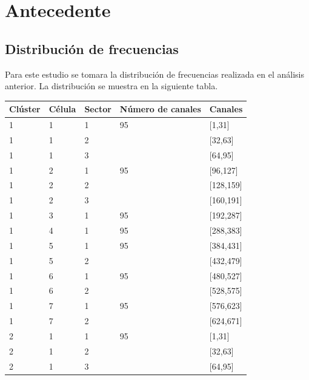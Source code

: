 \documentclass[11pt,letterpaper]{article}
\begin{document}


\newpage
\tableofcontents
\listoffigures
\listoftables


\newpage
\section{Antecedente}
\subsection{Distribución de frecuencias}
Para este estudio se tomara la distribución de frecuencias realizada en el análisis 
anterior. La distribución se muestra en la siguiente tabla. 
\begin{table}[ht]
    \centering
    \begin{tabular}{|l|l|l|l|l|}
    \hline
    Clúster & Célula & Sector & Número de canales & Canales \\ \hline
    1 & 1 & 1 & 95 & [1,31] \\ \hline
    1 & 1 & 2 &  & [32,63] \\ \hline
    1 & 1 & 3 &  & [64,95] \\ \hline

    1 & 2 & 1 & 95 & [96,127] \\ \hline
    1 & 2 & 2 &  & [128,159] \\ \hline
    1 & 2 & 3 &  & [160,191] \\ \hline

    1 & 3 & 1 & 95 & [192,287] \\ \hline

    1 & 4 & 1 & 95 & [288,383] \\ \hline

    1 & 5 & 1 & 95 & [384,431] \\ \hline
    1 & 5 & 2 &  & [432,479] \\ \hline

    1 & 6 & 1 & 95 & [480,527] \\ \hline
    1 & 6 & 2 &  & [528,575] \\ \hline

    1 & 7 & 1 & 95 & [576,623] \\ \hline
    1 & 7 & 2 &  & [624,671] \\ \hline

    2 & 1 & 1 & 95 & [1,31] \\ \hline
    2 & 1 & 2 &  & [32,63] \\ \hline
    2 & 1 & 3 &  & [64,95] \\ \hline


\end{tabular}
\end{table}
\end{document}
